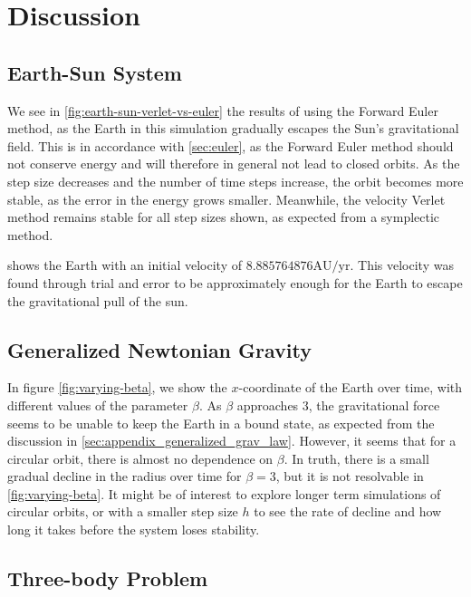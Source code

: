 \documentclass[../main.tex]{subfiles}
\begin{document}
\section{Discussion}\label{sec:discussion}

\subsection{Earth-Sun System}

We see in \cref{fig:earth-sun-verlet-vs-euler} the results of using the Forward Euler method, as the Earth in this simulation gradually escapes the Sun's gravitational field. This is in accordance with \cref{sec:euler}, as the Forward Euler method should not conserve energy and will therefore in general not lead to closed orbits. As the step size decreases and the number of time steps increase, the orbit becomes more stable, as the error in the energy grows smaller. Meanwhile, the velocity Verlet method remains stable for all step sizes shown, as expected from a symplectic method.

 shows the Earth with an initial velocity of $8.885764876 \text{AU}/\text{yr}$. This velocity was found through trial and error to be approximately enough for the Earth to escape the gravitational pull of the sun. 

\subsection{Generalized Newtonian Gravity}

In figure \cref{fig:varying-beta}, we show the $x$-coordinate of the Earth over time, with different values of the parameter $\beta$. As $\beta$ approaches $3$, the gravitational force seems to be unable to keep the Earth in a bound state, as expected from the discussion in \cref{sec:appendix_generalized_grav_law}. However, it seems that for a circular orbit, there is almost no dependence on $\beta$. In truth, there is a small gradual decline in the radius over time for $\beta = 3$, but it is not resolvable in \cref{fig:varying-beta}. It might be of interest to explore longer term simulations of circular orbits, or with a smaller step size $h$ to see the rate of decline and how long it takes before the system loses stability.

\subsection{Three-body Problem}
\end{document}
